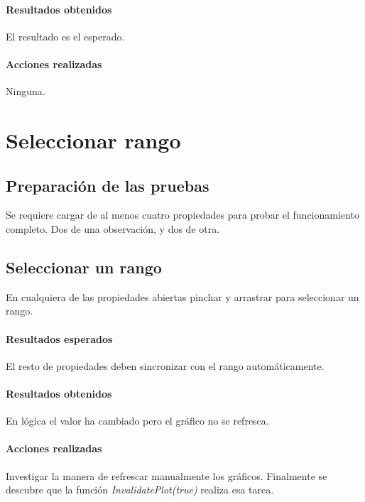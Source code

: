 \paragraph{Resultados obtenidos}
El resultado es el esperado.

\paragraph{Acciones realizadas}
Ninguna.

\section{Seleccionar rango}
\subsection{Preparaci\'on de las pruebas}
Se requiere cargar de al menos cuatro propiedades para probar el funcionamiento
completo. Dos de una observaci\'on, y dos de otra.

\subsection{Seleccionar un rango}
En cualquiera de las propiedades abiertas pinchar y arrastrar para seleccionar
un rango.

\paragraph{Resultados esperados}
El resto de propiedades deben sincronizar con el rango autom\'aticamente.

\paragraph{Resultados obtenidos}
En l\'ogica el valor ha cambiado pero el gr\'afico no se refresca.

\paragraph{Acciones realizadas}
Investigar la manera de refrescar manualmente los gr\'aficos.
Finalmente se descubre que la funci\'on \emph{InvalidatePlot(true)} realiza
esa tarea.